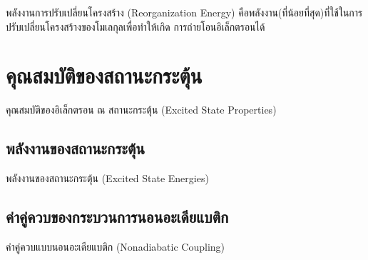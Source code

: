 พลังงานการปรับเปลี่ยนโครงสร้าง (Reorganization Energy) คือพลังงาน(ที่น้อยที่สุด)ที่ใช้ในการปรับเปลี่ยนโครงสร้างของโมเลกุลเพื่อทำให้เกิด%
การถ่ายโอนอิเล็กตรอนได้

\section{คุณสมบัติของสถานะกระตุ้น}
\label{sec:ex_prop}

คุณสมบัติของอิเล็กตรอน ณ สถานะกระตุ้น (Excited State Properties)

\subsection{พลังงานของสถานะกระตุ้น}
\label{ssec:ex_ener}

พลังงานของสถานะกระตุ้น (Excited State Energies)

\subsection{ค่าคู่ควบของกระบวนการนอนอะเดียแบติก}
\label{ssec:nonadia_ener}

ค่าคู่ควบแบบนอนอะเดียแบติก (Nonadiabatic Coupling)
